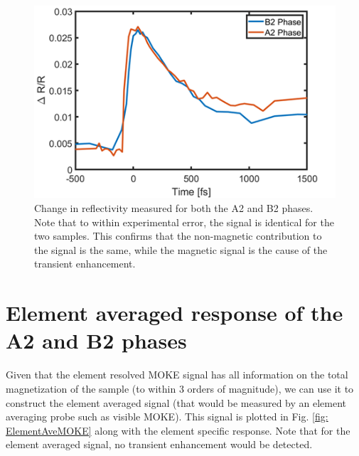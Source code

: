 \begin{figure}[htbp]
	\begin{center}
		\includegraphics[width=150mm]{figs/ReflectivityHeusler}
	\end{center}
	\caption{Change in reflectivity measured for both the A2 and B2 phases. Note that to within experimental error, the signal is identical for the two samples. This confirms that the non-magnetic contribution to the signal is the same, while the magnetic signal is the cause of the transient enhancement.}
	\label{fig: ReflectivityHeusler}
\end{figure}

\section{Element averaged response of the A2 and B2 phases}
Given that the element resolved MOKE signal has all information on the total magnetization of the sample (to within 3 orders of magnitude), we can use it to construct the element averaged signal (that would be measured by an element averaging probe such as visible MOKE). This signal is plotted in Fig. \ref{fig: ElementAveMOKE} along with the element specific response. Note that for the element averaged signal, no transient enhancement would be detected.

